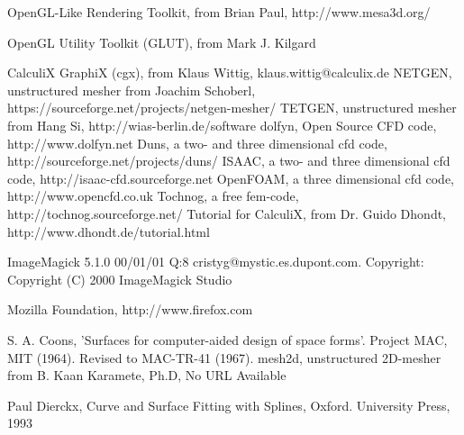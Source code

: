 \documentclass{article}
\begin{document}
\begin{thebibliography}{99}

 OpenGL-Like Rendering Toolkit, from Brian Paul, http://www.mesa3d.org/ 

 OpenGL Utility Toolkit (GLUT), from Mark J. Kilgard

 CalculiX GraphiX (cgx), from Klaus Wittig, klaus.wittig@calculix.de
 NETGEN, unstructured mesher from Joachim Schoberl, https://sourceforge.net/projects/netgen-mesher/
 TETGEN, unstructured mesher from Hang Si, http://wias-berlin.de/software
 dolfyn, Open Source CFD code, http://www.dolfyn.net
 Duns, a two- and three dimensional cfd code, http://sourceforge.net/projects/duns/
  ISAAC, a two- and three dimensional cfd code, http://isaac-cfd.sourceforge.net
 OpenFOAM, a three dimensional cfd code, http://www.opencfd.co.uk
 Tochnog, a free fem-code, http://tochnog.sourceforge.net/
 Tutorial for CalculiX, from Dr. Guido Dhondt, http://www.dhondt.de/tutorial.html

 ImageMagick 5.1.0 00/01/01 Q:8 cristyg@mystic.es.dupont.com. Copyright: Copyright (C) 2000 ImageMagick Studio 

 Mozilla Foundation, http://www.firefox.com

 S. A. Coons, 'Surfaces for computer-aided design of space forms'. Project MAC, MIT (1964). Revised to MAC-TR-41 (1967). 
 mesh2d, unstructured 2D-mesher from B. Kaan Karamete, Ph.D, No URL Available

 Paul Dierckx, Curve and Surface Fitting with Splines, Oxford. University Press, 1993

\end{thebibliography}
\end{document}
